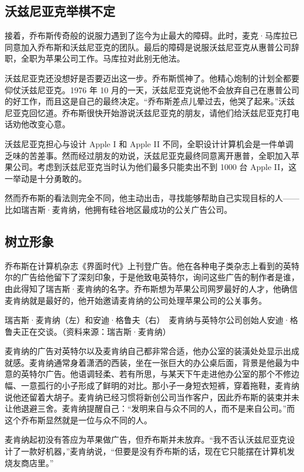 \documentclass[12pt,UTF8]{ctexbook}
\begin{document}
\subsection{沃兹尼亚克举棋不定}


接着，乔布斯传奇般的说服力遇到了迄今为止最大的障碍。此时，麦克·马库拉已同意加入乔布斯和沃兹尼亚克的团队。最后的障碍是说服沃兹尼亚克从惠普公司辞职，全职为苹果公司工作。马库拉对此别无他法。

沃兹尼亚克还没想好是否要迈出这一步。乔布斯慌神了。他精心炮制的计划全都要仰仗沃兹尼亚克。1976 年 10 月的一天，沃兹尼亚克说他不会放弃自己在惠普公司的好工作，而且这是自己的最终决定。“乔布斯差点儿晕过去，他哭了起来。”沃兹尼亚克回忆道。乔布斯很快开始游说沃兹尼亚克的朋友，请他们给沃兹尼亚克打电话劝他改变心意。

沃兹尼亚克担心与设计 Apple I 和 Apple II 不同，全职设计计算机会是一件单调乏味的苦差事。然而经过朋友的劝说，沃兹尼亚克最终同意离开惠普，全职加入苹果公司。考虑到沃兹尼亚克当时认为他们最多只能卖出不到 1000 台 Apple II，这一举动是十分勇敢的。

然而乔布斯的看法则完全不同，他主动出击，寻找能够帮助自己实现目标的人——比如瑞吉斯·麦肯纳，他拥有硅谷地区最成功的公关广告公司。





\subsection{树立形象}


乔布斯在计算机杂志《界面时代》上刊登广告。他在各种电子类杂志上看到的英特尔的广告给他留下了深刻印象，于是他致电英特尔，询问这些广告的制作者是谁，由此得知了瑞吉斯·麦肯纳的名字。乔布斯想为苹果公司网罗最好的人才，他确信麦肯纳就是最好的，他开始邀请麦肯纳的公司处理苹果公司的公关事务。



瑞吉斯·麦肯纳（左）和安迪·格鲁夫（右）　麦肯纳与英特尔公司创始人安迪·格鲁夫正在交谈。（资料来源：瑞吉斯·麦肯纳）

麦肯纳的广告对英特尔以及麦肯纳自己都非常合适，他办公室的装潢处处显示出成就感。麦肯纳通常身着潇洒的西装，坐在一张巨大的办公桌后面，背景是他最为中意的英特尔广告。他语调轻柔、若有所思，与某天下午走进他办公室的那个不修边幅、一意孤行的小子形成了鲜明的对比。那小子一身短衣短裤，穿着拖鞋，麦肯纳说他还留着大胡子。麦肯纳已经习惯将新创公司当作客户，因此乔布斯的装束并未让他退避三舍。麦肯纳提醒自己：“发明来自与众不同的人，而不是来自公司。”而这个乔布斯显然就是一位与众不同的人。

麦肯纳起初没有答应为苹果做广告，但乔布斯并未放弃。“我不否认沃兹尼亚克设计了一款好机器，”麦肯纳说，“但要是没有乔布斯的话，现在它只能摆在计算机发烧友商店里。”
\end{document}
